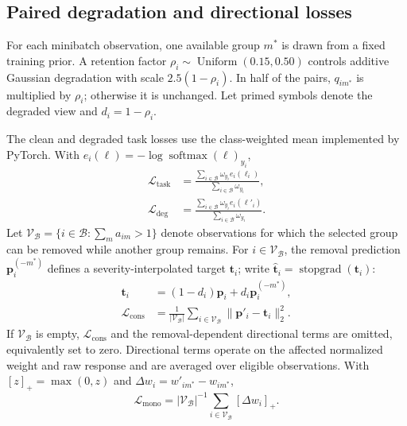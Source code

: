 \documentclass[11pt]{article}
\begin{document}
\subsection{Paired degradation and directional losses}

For each minibatch observation, one available group $m^*$ is drawn from a fixed training prior. A retention factor $\rho_i\sim\operatorname{Uniform}(0.15,0.50)$ controls additive Gaussian degradation with scale $2.5(1-\rho_i)$. In half of the pairs, $q_{im^*}$ is multiplied by $\rho_i$; otherwise it is unchanged. Let primed symbols denote the degraded view and $d_i=1-\rho_i$.

The clean and degraded task losses use the class-weighted mean implemented by PyTorch. With $e_i(\boldsymbol\ell)=-\log\operatorname{softmax}(\boldsymbol\ell)_{y_i}$,
\begin{equation}
\begin{aligned}
\mathcal L_{\mathrm{task}}&=
\frac{\sum_{i\in\mathcal B}\omega_{y_i}e_i(\boldsymbol\ell_i)}
{\sum_{i\in\mathcal B}\omega_{y_i}},\\
\mathcal L_{\mathrm{deg}}&=
\frac{\sum_{i\in\mathcal B}\omega_{y_i}e_i(\boldsymbol\ell'_i)}
{\sum_{i\in\mathcal B}\omega_{y_i}}.
\end{aligned}
\label{eq:task-losses}
\end{equation}
Let $\mathcal V_{\mathcal B}=\{i\in\mathcal B:\sum_m a_{im}>1\}$ denote observations for which the selected group can be removed while another group remains. For $i\in\mathcal V_{\mathcal B}$, the removal prediction $\mathbf p_i^{(-m^*)}$ defines a severity-interpolated target $\mathbf t_i$; write $\widehat{\mathbf t}_i=\operatorname{stopgrad}(\mathbf t_i)$:
\begin{equation}
\begin{aligned}
\mathbf t_i&=(1-d_i)\mathbf p_i+d_i\mathbf p_i^{(-m^*)},\\
\mathcal L_{\mathrm{cons}}&=\frac{1}{|\mathcal V_{\mathcal B}|}
\sum_{i\in\mathcal V_{\mathcal B}}
\|\mathbf p'_i-\widehat{\mathbf t}_i\|_2^2.
\end{aligned}
\end{equation}
If $\mathcal V_{\mathcal B}$ is empty, $\mathcal L_{\mathrm{cons}}$ and the removal-dependent directional terms are omitted, equivalently set to zero. Directional terms operate on the affected normalized weight and raw response and are averaged over eligible observations. With $[z]_+=\max(0,z)$ and $\Delta w_i=w'_{im^*}-w_{im^*}$,
\begin{equation}
\mathcal L_{\mathrm{mono}}=|\mathcal V_{\mathcal B}|^{-1}
\sum_{i\in\mathcal V_{\mathcal B}}[\Delta w_i]_+.
\end{equation}
\end{document}
